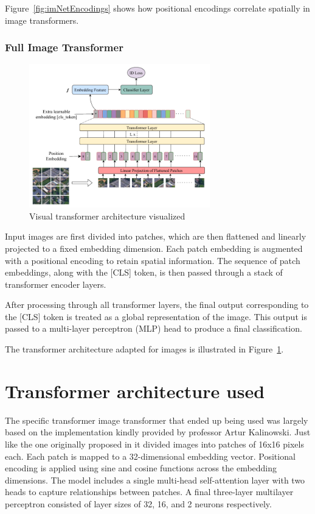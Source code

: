 \documentclass{pracalicmgr}
\begin{document}
Figure~\ref{fig:imNetEncodings} shows how positional encodings correlate spatially in image transformers.

\subsubsection{Full Image Transformer}

\begin{figure}[H]
    \centering
    \includegraphics[width=0.7\textwidth]{src/visNet.pdf}
    \caption{Visual transformer architecture visualized\cite{ViTFUllGraph}}
    \label{fig:visNetArch}
\end{figure}

Input images are first divided into patches, which are then flattened and linearly projected to a fixed embedding dimension. Each patch embedding is augmented with a positional encoding to retain spatial information. The sequence of patch embeddings, along with the [CLS] token, is then passed through a stack of transformer encoder layers.

After processing through all transformer layers, the final output corresponding to the [CLS] token is treated as a global representation of the image. This output is passed to a multi-layer perceptron (MLP) head to produce a final classification. 

The transformer architecture adapted for images is illustrated in Figure~\ref{fig:visNetArch}.

\section{Transformer architecture used}

The specific transformer image transformer that ended up being used was largely based on the implementation kindly provided by professor Artur Kalinowski. Just like the one originally proposed in \cite{ViT} it divided images into patches of 16x16 pixels each. Each patch is mapped to a 32-dimensional embedding vector. Positional encoding is applied using sine and cosine functions across the embedding dimensions. The model includes a single multi-head self-attention layer with two heads to capture relationships between patches. A final three-layer multilayer perceptron consisted of layer sizes of 32, 16, and 2 neurons respectively.
\end{document}
